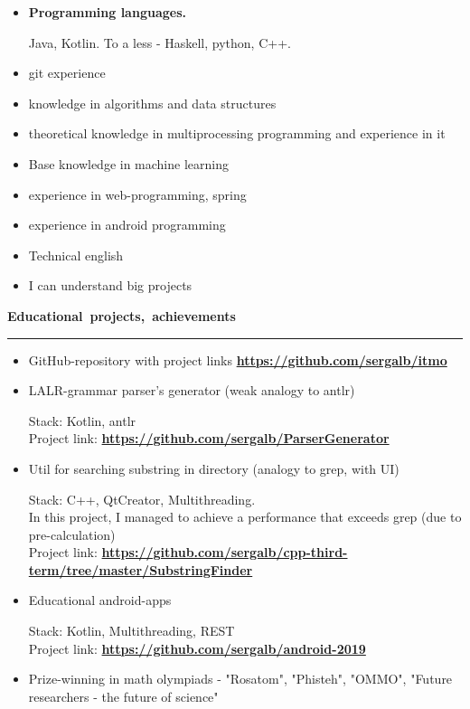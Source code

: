 \documentclass[12pt, a4paper]{report}
\begin{document}
    \begin{itemize}

        \item \textbf{Programming languages.}

        Java, Kotlin. To a less - Haskell, python, C++.

        \item git experience
        \item knowledge in algorithms and data structures
        \item theoretical knowledge in multiprocessing programming and experience in it
        \item Base knowledge in machine learning
        \item experience in web-programming, spring
        \item experience in android programming
        \item Technical english
        \item I can understand big projects\\
    \end{itemize}

    \par\hbox{\large\textbf{Educational projects, achievements}}\kern5pt\hrule\kern5pt
    \begin{itemize}

        \item GitHub-repository with project links \textbf{\url{https://github.com/sergalb/itmo}}

        \item LALR-grammar parser's generator (weak analogy to  antlr)

        Stack: Kotlin, antlr\\
        Project link:
        \textbf{
        \url{https://github.com/sergalb/ParserGenerator}
        }

        \item Util for searching substring in directory (analogy to grep, with UI)

        Stack: C++, QtCreator, Multithreading.\\
        In this project, I managed to achieve a performance that exceeds grep (due to pre-calculation)\\
        Project link:
        \textbf{
        \url{https://github.com/sergalb/cpp-third-term/tree/master/SubstringFinder}
        }

        \item Educational android-apps

        Stack: Kotlin, Multithreading, REST\\
        Project link:
        \textbf{
        \url{https://github.com/sergalb/android-2019}
        }

        \item Prize-winning in math olympiads - "Rosatom", "Phisteh", "OMMO", "Future researchers - the future of science"

    \end{itemize}
\end{document}
